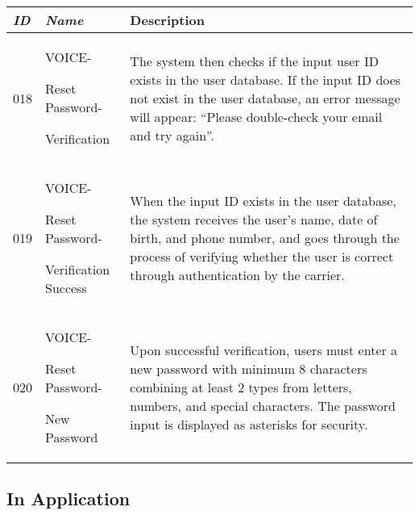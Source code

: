 \documentclass[conference]{IEEEtran}
\begin{document}
\begin{enumerate}[label=\arabic*]
    \newpage

    \begin{table}[h]
    \def\arraystretch{1.2} \small
        \begin{tabular}{|p{1cm}|p{1.8cm}|p{4.8cm}|}
        \hline
            \textit{\textbf{ID}} & \textit{\textbf{Name}} & {\textbf{Description}} \\
        \hline
            018 \par & VOICE-\par Reset Password-\par Verification & The system then checks if the input user ID exists in the user database. If the input ID does not exist in the user database, an error message will appear: “Please double-check your email and try again”. \\
        \hline
            019 \par & VOICE-\par Reset Password-\par Verification Success & When the input ID exists in the user database, the system receives the user’s name, date of birth, and phone number, and goes through the process of verifying whether the user is correct through authentication by the carrier. \\
        \hline
            020 \par & VOICE-\par Reset Password-\par New Password & Upon successful verification, users must enter a new password with minimum 8 characters combining at least 2 types from letters, numbers, and special characters. The password input is displayed as asterisks for security. \\
        \hline
        \end{tabular}
    \end{table}
\end{enumerate}

\vspace{0.7em} %

\subsection{In Application}
\vspace{0.5em}
\end{document}
